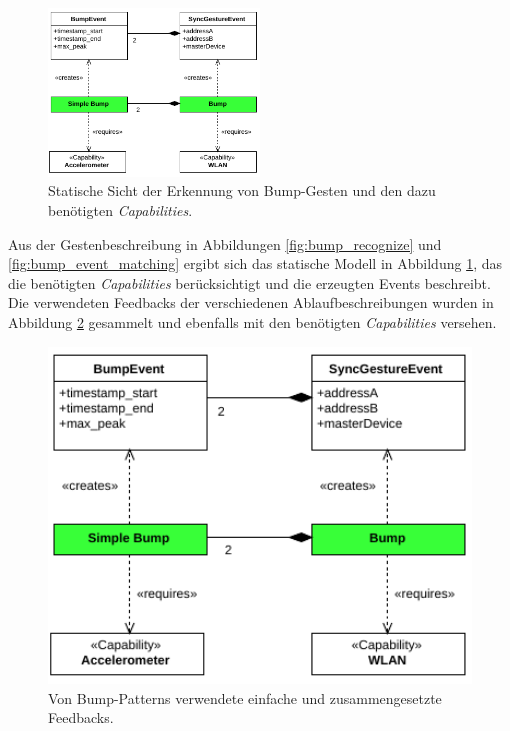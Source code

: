 \begin{figure}[h]
\centering
\includegraphics[page=1,width=0.5\textwidth]{bilder/bump/domain_model}
\caption{Statische Sicht der Erkennung von Bump-Gesten und den dazu benötigten \textit{Capabilities}.}
\label{fig:bump_dm_gesture}
\end{figure}

Aus der Gestenbeschreibung in Abbildungen \ref{fig:bump_recognize} und \ref{fig:bump_event_matching} ergibt sich das statische Modell in Abbildung \ref{fig:bump_dm_gesture}, das die benötigten \textit{Capabilities} berücksichtigt und die erzeugten Events beschreibt. Die verwendeten Feedbacks der verschiedenen Ablaufbeschreibungen wurden in Abbildung \ref{fig:bump_dm_feedback} gesammelt und ebenfalls mit den benötigten \textit{Capabilities} versehen.

\begin{figure}[h!]
\centering
\includegraphics[page=2,width=1\textwidth]{bilder/bump/domain_model}
\caption{Von Bump-Patterns verwendete einfache und zusammengesetzte Feedbacks.}
\label{fig:bump_dm_feedback}
\end{figure}

